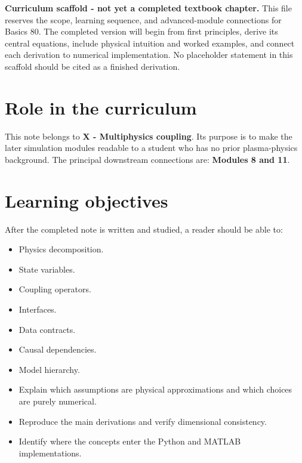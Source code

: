 \documentclass[11pt]{article}
\begin{document}

\begin{overviewbox}
\textbf{Curriculum scaffold - not yet a completed textbook chapter.} This file reserves the scope, learning sequence, and advanced-module connections for Basics 80. The completed version will begin from first principles, derive its central equations, include physical intuition and worked examples, and connect each derivation to numerical implementation. No placeholder statement in this scaffold should be cited as a finished derivation.
\end{overviewbox}

\ProjectTOC

\section{Role in the curriculum}
This note belongs to \textbf{X - Multiphysics coupling}. Its purpose is to make the later simulation modules readable to a student who has no prior plasma-physics background. The principal downstream connections are: \textbf{Modules 8 and 11}.

\section{Learning objectives}
After the completed note is written and studied, a reader should be able to:
\begin{itemize}[leftmargin=1.6em]
\item Physics decomposition.
\item State variables.
\item Coupling operators.
\item Interfaces.
\item Data contracts.
\item Causal dependencies.
\item Model hierarchy.
\item Explain which assumptions are physical approximations and which choices are purely numerical.
\item Reproduce the main derivations and verify dimensional consistency.
\item Identify where the concepts enter the Python and MATLAB implementations.
\end{itemize}
\end{document}
